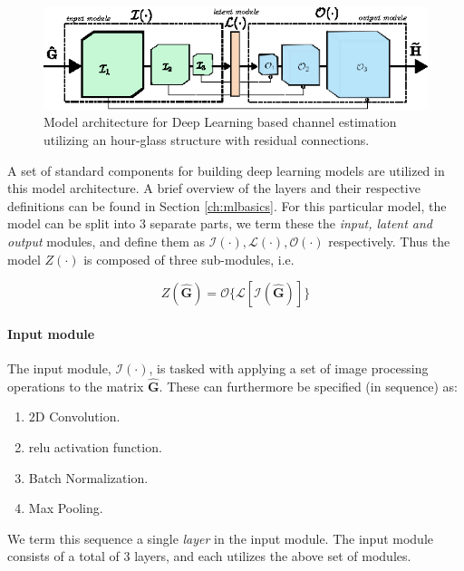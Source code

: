 \begin{figure}
    \centering
    \includegraphics{chapters/part_uplink/figures/model_architecture.eps}
    \caption{Model architecture for Deep Learning based channel estimation utilizing an hour-glass structure with residual connections.}
    \label{fig:model_architecture_channel_estimation}
\end{figure}

A set of standard components for building deep learning models are utilized in this model architecture. A brief overview of the layers and their respective definitions can be found in Section \ref{ch:mlbasics}. For this particular model, the model can be split into 3 separate parts, we term these the \emph{input, latent and output} modules, and define them as $\mathcal{I}(\cdot), \mathcal{L}(\cdot), \mathcal{O}(\cdot)$ respectively. Thus the model $Z(\cdot)$ is composed of three sub-modules, i.e. 

\begin{equation}
    Z(\mathbf{\hat{G}}) = \mathcal{O}\{\mathcal{L}[\mathcal{I}(\mathbf{\hat{G}})]\}
\end{equation}

\paragraph{Input module}
The input module, $\mathcal{I}(\cdot)$, is tasked with applying a set of image processing operations to the matrix $\mathbf{\hat{G}}$. These can furthermore be specified (in sequence) as:

\begin{enumerate}
    \item $2$D Convolution.
    \item \gls{relu} activation function.
    \item Batch Normalization.
    \item Max Pooling.
\end{enumerate}

We term this sequence a single \emph{layer} in the input module. The input module consists of a total of $3$ layers, and each utilizes the above set of modules.

